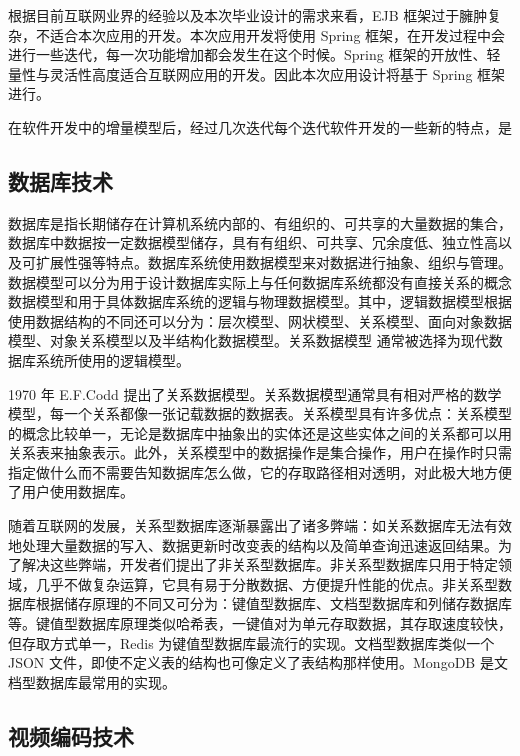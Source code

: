 根据目前互联网业界的经验以及本次毕业设计的需求来看，EJB 框架过于臃肿复杂，不适合本次应用的开发。本次应用开发将使用 Spring 框架，在开发过程中会进行一些迭代，每一次功能增加都会发生在这个时候。Spring 框架的开放性、轻量性与灵活性高度适合互联网应用的开发。因此本次应用设计将基于 Spring 框架进行\cite{walls2016spring}。

在软件开发中的增量模型后，经过几次迭代每个迭代软件开发的一些新的特点，是

\subsection{数据库技术}

数据库是指长期储存在计算机系统内部的、有组织的、可共享的大量数据的集合，数据库中数据按一定数据模型储存，具有有组织、可共享、冗余度低、独立性高以及可扩展性强等特点\cite{王珊2006数据库系统概论}。数据库系统使用数据模型来对数据进行抽象、组织与管理。数据模型可以分为用于设计数据库实际上与任何数据库系统都没有直接关系的概念数据模型和用于具体数据库系统的逻辑与物理数据模型。其中，逻辑数据模型根据使用数据结构的不同还可以分为：层次模型、网状模型、关系模型、面向对象数据模型、对象关系模型以及半结构化数据模型。关系数据模型\cite{bachman1972evolution} 通常被选择为现代数据库系统所使用的逻辑模型。

1970 年 E.F.Codd 提出了关系数据模型。关系数据模型通常具有相对严格的数学模型，每一个关系都像一张记载数据的数据表。关系模型具有许多优点：关系模型的概念比较单一，无论是数据库中抽象出的实体还是这些实体之间的关系都可以用关系表来抽象表示\cite{codd1970relational}。此外，关系模型中的数据操作是集合操作，用户在操作时只需指定做什么而不需要告知数据库怎么做，它的存取路径相对透明，对此极大地方便了用户使用数据库。

随着互联网的发展，关系型数据库逐渐暴露出了诸多弊端：如关系数据库无法有效地处理大量数据的写入、数据更新时改变表的结构以及简单查询迅速返回结果。为了解决这些弊端，开发者们提出了非关系型数据库。非关系型数据库只用于特定领域，几乎不做复杂运算，它具有易于分散数据、方便提升性能的优点。非关系型数据库根据储存原理的不同又可分为：键值型数据库、文档型数据库和列储存数据库等\cite{strauch2011nosql}。键值型数据库原理类似哈希表，一键值对为单元存取数据，其存取速度较快，但存取方式单一，Redis 为键值型数据库最流行的实现。文档型数据库类似一个 JSON 文件，即使不定义表的结构也可像定义了表结构那样使用。MongoDB 是文档型数据库最常用的实现。

\subsection{视频编码技术}

